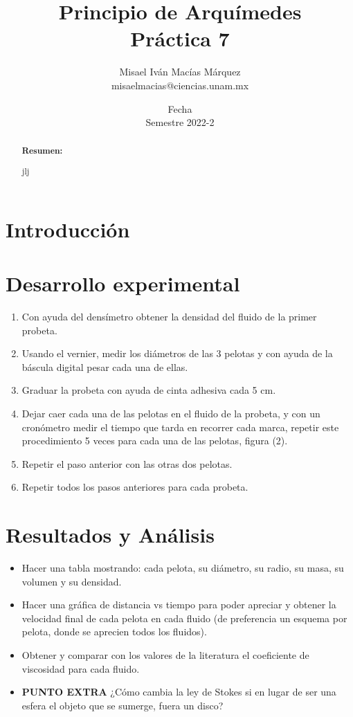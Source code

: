 \documentclass[DIV=calc, paper=a4, fontsize=11pt]{scrartcl}
\title{Principio de Arquímedes\\ %
Práctica 7} %
\author{Misael Iván Macías Márquez\\
misaelmacias@ciencias.unam.mx}
\date{Fecha\\Semestre 2022-2}
\begin{document}
\maketitle


\begin{abstract}
\textbf{Resumen:} 


jlj
\end{abstract}

\begin{multicols}{2}




\section*{Introducción}





\section*{Desarrollo experimental}
\begin{enumerate}
\item Con ayuda del dens\'imetro obtener la densidad del fluido de la primer probeta.
\item Usando el vernier, medir los diámetros de las 3 pelotas y con ayuda de la báscula digital pesar cada una de ellas.
\item Graduar la probeta con ayuda de cinta adhesiva cada 5 cm.
\item Dejar caer cada una de las pelotas en el fluido de la probeta, y con un cronómetro medir el tiempo que tarda en recorrer cada marca, repetir este procedimiento 5 veces para cada una de las pelotas, figura (2).
\item Repetir el paso anterior con las otras dos pelotas.
\item Repetir todos los pasos anteriores para cada probeta.
\end{enumerate}


\section*{Resultados y Análisis}
\begin{itemize}
\item Hacer una tabla mostrando: cada pelota, su di\'ametro, su radio, su masa, su volumen y su densidad.
\item Hacer una gr\'afica de distancia vs tiempo para poder apreciar y obtener la velocidad final de cada pelota en cada fluido (de preferencia un esquema por pelota, donde se aprecien todos los fluidos).
\item Obtener y comparar con los valores de la literatura el coeficiente de viscosidad para cada fluido.
\item \textbf{PUNTO EXTRA} ¿C\'omo cambia la ley de Stokes si en lugar de ser una esfera el objeto que se sumerge, fuera un disco?
\end{itemize}


\end{multicols}
\end{document}
